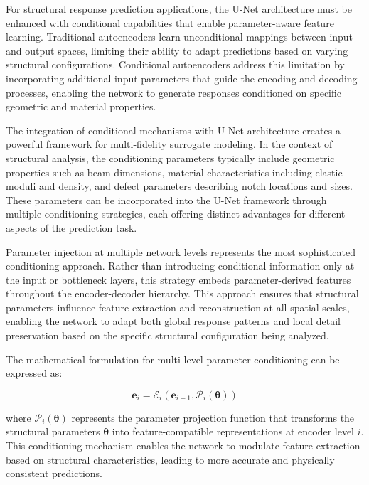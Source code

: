 \documentclass[12pt,a4paper]{report}
\begin{document}
For structural response prediction applications, the U-Net architecture must be enhanced with conditional capabilities that enable parameter-aware feature learning. Traditional autoencoders learn unconditional mappings between input and output spaces, limiting their ability to adapt predictions based on varying structural configurations. Conditional autoencoders address this limitation by incorporating additional input parameters that guide the encoding and decoding processes, enabling the network to generate responses conditioned on specific geometric and material properties.

The integration of conditional mechanisms with U-Net architecture creates a powerful framework for multi-fidelity surrogate modeling. In the context of structural analysis, the conditioning parameters typically include geometric properties such as beam dimensions, material characteristics including elastic moduli and density, and defect parameters describing notch locations and sizes. These parameters can be incorporated into the U-Net framework through multiple conditioning strategies, each offering distinct advantages for different aspects of the prediction task.

Parameter injection at multiple network levels represents the most sophisticated conditioning approach. Rather than introducing conditional information only at the input or bottleneck layers, this strategy embeds parameter-derived features throughout the encoder-decoder hierarchy. This approach ensures that structural parameters influence feature extraction and reconstruction at all spatial scales, enabling the network to adapt both global response patterns and local detail preservation based on the specific structural configuration being analyzed.

The mathematical formulation for multi-level parameter conditioning can be expressed as:

\begin{equation}
\mathbf{e}_i = \mathcal{E}_i(\mathbf{e}_{i-1}, \mathcal{P}_i(\boldsymbol{\theta}))
\end{equation}

where $\mathcal{P}_i(\boldsymbol{\theta})$ represents the parameter projection function that transforms the structural parameters $\boldsymbol{\theta}$ into feature-compatible representations at encoder level $i$. This conditioning mechanism enables the network to modulate feature extraction based on structural characteristics, leading to more accurate and physically consistent predictions.
\end{document}
